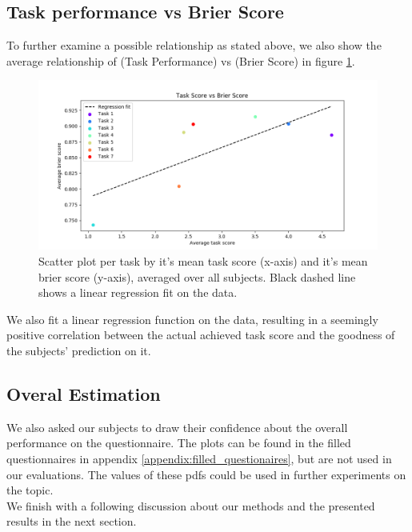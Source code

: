 \documentclass[../main/main.tex]{subfiles}
\begin{document}
\subsection{Task performance vs Brier Score}
To further examine a possible relationship as stated above, we also show the average relationship of (Task Performance) vs (Brier Score) in figure \ref{fig:brier_vs_rating}.
\begin{figure}[H]
	\centering
	\captionsetup{justification=centering}
	\includegraphics[width=\textwidth]{../assets/brier_vs_rating.png}
	\caption{Scatter plot per task by it's mean task score (x-axis) and it's mean brier score (y-axis), averaged over all subjects. Black dashed line shows a linear regression fit on the data.}
	\label{fig:brier_vs_rating} 
\end{figure}
We also fit a linear regression function on the data, resulting in a seemingly positive correlation between the actual achieved task score and the goodness of the subjects' prediction on it.
\subsection{Overal Estimation}
We also asked our subjects to draw their confidence about the overall performance on the questionnaire. The plots can be found in the filled questionnaires in appendix \ref{appendix:filled_questionaires}, but are not used in our evaluations. The values of these pdfs could be used in further experiments on the topic.\\
We finish with a following discussion about our methods and the presented results in the next section.
\end{document}
